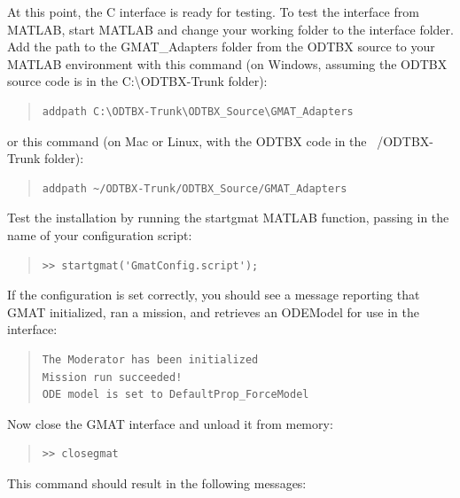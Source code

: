 \documentclass[letterpaper,10pt]{article}
\begin{document}
At this point, the C interface is ready for testing.  To test the interface from MATLAB, start MATLAB and change your working folder to the interface folder.  Add the path to the GMAT\_Adapters folder from the ODTBX source to your MATLAB environment with this command (on Windows, assuming the ODTBX source code is in the C:{\textbackslash}ODTBX-Trunk folder):

\begin{quote}
\begin{verbatim}
addpath C:\ODTBX-Trunk\ODTBX_Source\GMAT_Adapters
\end{verbatim}
\end{quote}

\noindent or this command (on Mac or Linux, with the ODTBX code in the ~/ODTBX-Trunk folder):

\begin{quote}
\begin{verbatim}
addpath ~/ODTBX-Trunk/ODTBX_Source/GMAT_Adapters
\end{verbatim}
\end{quote}

Test the installation by running the startgmat MATLAB function, passing in the name of your configuration script:

\begin{quote}
\begin{verbatim}
>> startgmat('GmatConfig.script');
\end{verbatim}
\end{quote}

\noindent If the configuration is set correctly, you should see a message reporting that GMAT initialized, ran a mission, and retrieves an ODEModel for use in the interface: 
\begin{quote}
\begin{verbatim}
The Moderator has been initialized
Mission run succeeded!
ODE model is set to DefaultProp_ForceModel
\end{verbatim}
\end{quote}

\noindent Now close the GMAT interface and unload it from memory:

\begin{quote}
\begin{verbatim}
>> closegmat
\end{verbatim}
\end{quote}

\noindent This command should result in the following messages: 
\end{document}
